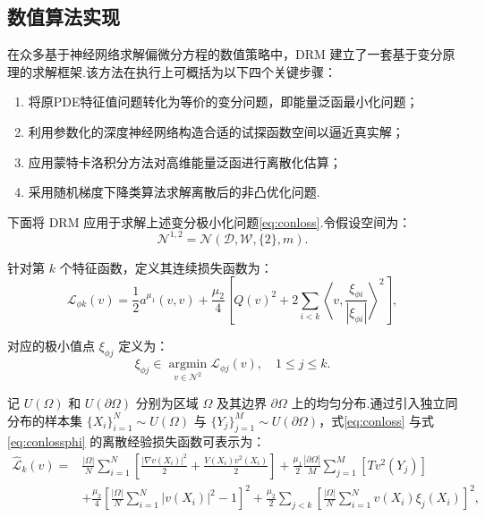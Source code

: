 \subsection{数值算法实现}
在众多基于神经网络求解偏微分方程的数值策略中，DRM \cite{Weinan2017The} 建立了一套基于变分原理的求解框架.该方法在执行上可概括为以下四个关键步骤：
\begin{enumerate}
    \item 将原PDE特征值问题转化为等价的变分问题，即能量泛函最小化问题；
    \item 利用参数化的深度神经网络构造合适的试探函数空间以逼近真实解；
    \item 应用蒙特卡洛积分方法对高维能量泛函进行离散化估算；
    \item 采用随机梯度下降类算法求解离散后的非凸优化问题.
\end{enumerate}

下面将 DRM 应用于求解上述变分极小化问题\eqref{eq:conloss}.令假设空间为：
$$\mathcal{N}^{1,2}=\mathcal{N}(\mathcal{D},\mathcal{W},\{2\},m).$$

针对第 $k$ 个特征函数，定义其连续损失函数为：
\begin{equation}\label{eq:conlossphi}
\mathcal{L}_{\phi k}(v)=\frac{1}{2} a^{\mu_{1}}(v, v)+\frac{\mu_{2}}{4}\left[Q(v)^{2}+2 \sum_{i<k}\left\langle v, \frac{\xi_{\phi i}}{\left|\xi_{\phi i}\right|}\right\rangle^{2}\right],
\end{equation}

对应的极小值点 $\xi_{\phi j}$ 定义为：
\begin{equation*}
\xi_{\phi j} \in \underset{v \in \mathcal{N}^{2}}{\operatorname{argmin}} \mathcal{L}_{\phi j}(v),\quad 1\leq j\leq k.
\end{equation*}

记 $U(\Omega)$ 和 $U(\partial\Omega)$ 分别为区域 $\Omega$ 及其边界 $\partial\Omega$ 上的均匀分布.通过引入独立同分布的样本集 $\{X_{i}\}_{i=1}^{N}\sim U(\Omega)$ 与 $\{Y_{j}\}_{j=1}^{M}\sim U(\partial\Omega)$，式\eqref{eq:conloss} 与式\eqref{eq:conlossphi} 的离散经验损失函数可表示为：
\begin{equation}\label{eq:disloss}
\begin{aligned}
\widehat{\mathcal{L}}_{k}(v) = & \frac{|\Omega|}{N}\sum\limits_{i=1}^{N} \left[ \frac{|\nabla v(X_{i})|^{2}}{2}+\frac{V(X_{i})v^{2}(X_{i})}{2}\right]+\frac{\mu_{1}}{2}\frac{|\partial\Omega|}{M}\sum\limits_{j=1}^{M}\left[ Tv^{2}(Y_{j}) \right] \\
&+\frac{\mu_{2}}{4}\left[\frac{|\Omega|}{N}\sum\limits_{i=1}^{N}|v(X_{i})|^{2}-1\right]^{2}+\frac{\mu_{2}}{2}\sum_{j<k}\left[\frac{|\Omega|}{N}\sum\limits_{i=1}^{N}v(X_{i})\xi_{j}(X_{i})\right]^{2},
\end{aligned}
\end{equation}


